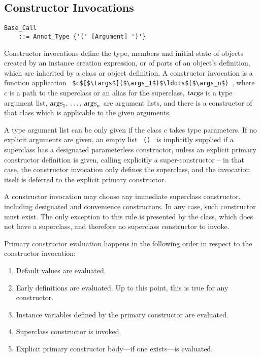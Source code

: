 \subsection{Constructor Invocations}
\label{sec:constructor-invocations}

\grammar\begin{lstlisting}
Base_Call 
    ::= Annot_Type {'(' [Argument] ')'}
\end{lstlisting}

Constructor invocations define the type, members and initial state of objects created by an instance creation expression, or of parts of an object's definition, which are inherited by a class or object definition. A constructor invocation is a function application ~\lstinline!$c$[$\targs$]($\args_1$)$\ldots$($\args_n$)!~, where $c$ is a path to the superclass or an alias for the superclass, $\mbox{\sl targs}$ is a type argument list, $\mbox{\sl args}_1 ,\, \ldots ,\, \mbox{\sl args}_n$ are argument lists, and there is a constructor of that class which is applicable to the given arguments. 

A type argument list can be only given if the class $c$ takes type parameters. If no explicit arguments are given, an empty list ~\lstinline!()!~ is implicitly supplied if a superclass has a designated parameterless constructor, unless an explicit primary constructor definition is given, calling explicitly a super-constructor -- in that case, the constructor invocation only defines the superclass, and the invocation itself is deferred to the explicit primary constructor. 

A constructor invocation may choose any immediate superclass constructor, including designated and convenience constructors. In any case, such constructor must exist. The only exception to this rule is presented by the  class, which does not have a superclass, and therefore no superclass constructor to invoke. 

Primary constructor evaluation happens in the following order in respect to the constructor invocation: 
\begin{enumerate}
  \item Default values are evaluated. 
  \item Early definitions are evaluated. Up to this point, this is true for any constructor. 
  \item Instance variables defined by the primary constructor are evaluated. 
  \item Superclass constructor is invoked. 
  \item Explicit primary constructor body---if one exists---is evaluated. 
\end{enumerate}





